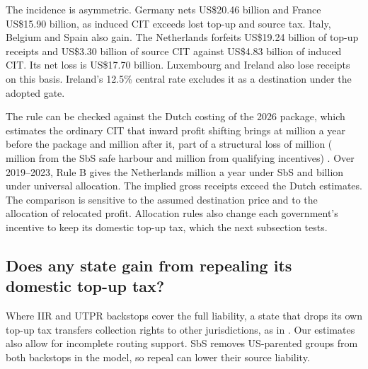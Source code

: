 \documentclass[11pt,a4paper]{article}
\newcommand{\EUR}{\texteuro}
\newcommand{\usd}{US\$}
\begin{document}
The incidence is asymmetric. Germany nets \usd20.46 billion and France \usd15.90 billion, as induced CIT exceeds lost top-up and source tax. Italy, Belgium and Spain also gain. The Netherlands forfeits \usd19.24 billion of top-up receipts and \usd3.30 billion of source CIT against \usd4.83 billion of induced CIT. Its net loss is \usd17.70 billion. Luxembourg and Ireland also lose receipts on this basis. Ireland’s 12.5\% central rate excludes it as a destination under the adopted gate.

The rule can be checked against the Dutch costing of the 2026 package, which estimates the ordinary CIT that inward profit shifting brings at \EUR451 million a year before the package and \EUR397 million after it, part of a structural loss of \EUR108 million (\EUR73 million from the SbS safe harbour and \EUR35 million from qualifying incentives) \citep{37025_6}. Over 2019–2023, Rule B gives the Netherlands \EUR628 million a year under SbS and \EUR1.012 billion under universal allocation. The implied gross receipts exceed the Dutch estimates. The comparison is sensitive to the assumed destination price and to the allocation of relocated profit. Allocation rules also change each government's incentive to keep its domestic top-up tax, which the next subsection tests.

\subsection{Does any state gain from repealing its domestic top-up tax?}\label{sec:repeal_game}

Where IIR and UTPR backstops cover the full liability, a state that drops its own top-up tax transfers collection rights to other jurisdictions, as in \citet{devereux2022}. Our estimates also allow for incomplete routing support. SbS removes US-parented groups from both backstops in the model, so repeal can lower their source liability.
\end{document}
